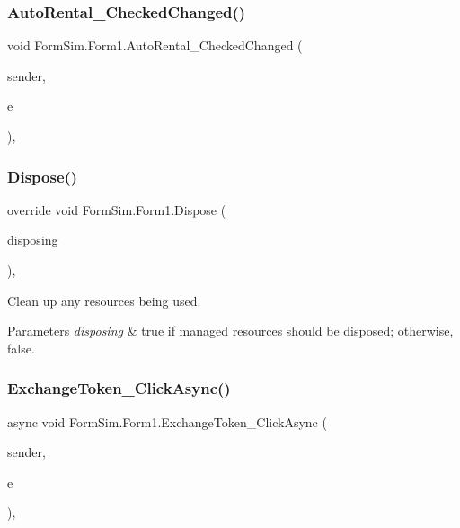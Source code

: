 \subsubsection{\texorpdfstring{Auto\+Rental\+\_\+\+Checked\+Changed()}{AutoRental\_CheckedChanged()}}
{\footnotesize\ttfamily void Form\+Sim.\+Form1.\+Auto\+Rental\+\_\+\+Checked\+Changed (\begin{DoxyParamCaption}\item[{object}]{sender,  }\item[{Event\+Args}]{e }\end{DoxyParamCaption})\hspace{0.3cm}{\ttfamily [inline]}, {\ttfamily [private]}}

\mbox{\label{class_form_sim_1_1_form1_a5ab3d8b7fa32d3c15b3690d53104deae}} 
\subsubsection{\texorpdfstring{Dispose()}{Dispose()}}
{\footnotesize\ttfamily override void Form\+Sim.\+Form1.\+Dispose (\begin{DoxyParamCaption}\item[{bool}]{disposing }\end{DoxyParamCaption})\hspace{0.3cm}{\ttfamily [inline]}, {\ttfamily [protected]}}



Clean up any resources being used. 


\begin{DoxyParams}{Parameters}
{\em disposing} & true if managed resources should be disposed; otherwise, false.\\
\hline
\end{DoxyParams}
\mbox{\label{class_form_sim_1_1_form1_a93df121074a9d4a5d84028c88006cd85}} 
\subsubsection{\texorpdfstring{Exchange\+Token\+\_\+\+Click\+Async()}{ExchangeToken\_ClickAsync()}}
{\footnotesize\ttfamily async void Form\+Sim.\+Form1.\+Exchange\+Token\+\_\+\+Click\+Async (\begin{DoxyParamCaption}\item[{object}]{sender,  }\item[{Event\+Args}]{e }\end{DoxyParamCaption})\hspace{0.3cm}{\ttfamily [inline]}, {\ttfamily [private]}}

